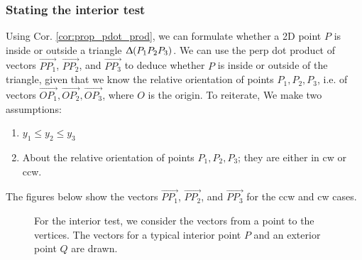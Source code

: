 \documentclass[a4paper]{article}
\begin{document}
\subsubsection{Stating the interior test}

Using Cor. \ref{cor:prop_pdot_prod}, we can formulate whether a 2D point $P$ is inside or outside a triangle $\Updelta(P_1P_2P_3)$. We can use the perp dot product of vectors  $\overrightarrow{PP_1}$, $\overrightarrow{PP_2}$, and $\overrightarrow{PP_3}$ to deduce whether $P$ is inside or outside of the triangle, given that we know the relative orientation of points $P_1, P_2, P_3$, i.e. of vectors $\overrightarrow{OP_1}, \overrightarrow{OP_2},\overrightarrow{OP_3}$, where $O$ is the origin. To reiterate, We make two assumptions:
\begin{enumerate}
    \item $y_1 \leq y_2 \leq y_3$
    \item About the relative orientation of points $P_1, P_2, P_3$; they are either in cw or ccw.
\end{enumerate}

The figures below show the vectors $\overrightarrow{PP_1}$, $\overrightarrow{PP_2}$, and $\overrightarrow{PP_3}$ for the ccw and cw cases.

\begin{figure}[H]
    \centering
    \qquad \qquad
    \caption{For the interior test, we consider the vectors from a point to the vertices. The vectors for a typical interior point  $P$ and an exterior point $Q$ are drawn.}
    \label{fig:triangle_int_ext}
\end{figure}
\end{document}
